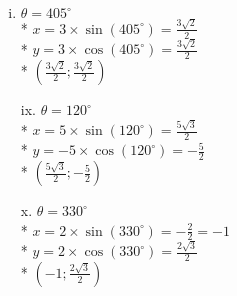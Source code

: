 \documentclass[a4paper]{article}
\begin{document}
\begin{enumerate}[a)]
\begin{enumerate}[vi.]
      \item $\theta = 405^{\circ}$\\*
      $x = 3 \times \sin (405^{\circ}) = \frac{3\sqrt{2}}{2}$\\*
      $y = 3 \times \cos (405^{\circ}) = \frac{3\sqrt{2}}{2}$\\*
      $(\frac{3\sqrt{2}}{2};\frac{3\sqrt{2}}{2})$

      \item[ix.] $\theta = 120^{\circ}$\\*
      $x = 5 \times \sin (120^{\circ}) = \frac{5\sqrt{3}}{2}$\\*
      $y = - 5 \times \cos (120^{\circ}) = -\frac{5}{2}$\\*
      $(\frac{5\sqrt{3}}{2};-\frac{5}{2})$

      \item[x.] $\theta = 330^{\circ}$\\*
      $x = 2 \times \sin (330^{\circ}) = -\frac{2}{2} = -1$\\*
      $y = 2 \times \cos (330^{\circ}) = \frac{2\sqrt{3}}{2}$\\*
      $(-1;\frac{2\sqrt{3}}{2})$
    \end{enumerate}
  \end{enumerate}
\end{document}
